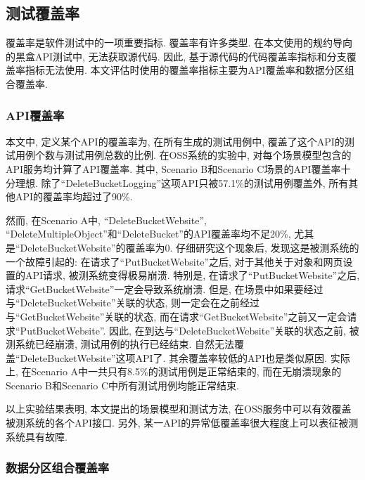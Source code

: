         \subsection{测试覆盖率}
            覆盖率是软件测试中的一项重要指标. 覆盖率有许多类型. 在本文使用的规约导向的黑盒API测试中, 无法获取源代码. 因此, 基于源代码的代码覆盖率指标和分支覆盖率指标无法使用. 本文评估时使用的覆盖率指标主要为API覆盖率和数据分区组合覆盖率.
            
            \subsubsection{API覆盖率}
            
                本文中, 定义某个API的覆盖率为, 在所有生成的测试用例中, 覆盖了这个API的测试用例个数与测试用例总数的比例. 在OSS系统的实验中, 对每个场景模型包含的API服务均计算了API覆盖率. 其中, Scenario B和Scenario C场景的API覆盖率十分理想. 除了“DeleteBucketLogging”这项API只被57.1\%的测试用例覆盖外, 所有其他API的覆盖率均超过了90\%.
                
                然而, 在Scenario A中, “DeleteBucketWebsite”, “DeleteMultipleObject”和“DeleteBucket”的API覆盖率均不足20\%, 尤其是“DeleteBucketWebsite”的覆盖率为0. 仔细研究这个现象后, 发现这是被测系统的一个故障引起的: 在请求了“PutBucketWebsite”之后, 对于其他关于对象和网页设置的API请求, 被测系统变得极易崩溃. 特别是, 在请求了“PutBucketWebsite”之后, 请求“GetBucketWebsite”一定会导致系统崩溃. 但是, 在场景中如果要经过与“DeleteBucketWebsite”关联的状态, 则一定会在之前经过与“GetBucketWebsite”关联的状态, 而在请求“GetBucketWebsite”之前又一定会请求“PutBucketWebsite”. 因此, 在到达与“DeleteBucketWebsite”关联的状态之前, 被测系统已经崩溃, 测试用例的执行已经结束. 自然无法覆盖“DeleteBucketWebsite”这项API了. 其余覆盖率较低的API也是类似原因. 实际上, 在Scenario A中一共只有8.5\%的测试用例是正常结束的, 而在无崩溃现象的Scenario B和Scenario C中所有测试用例均能正常结束.
                
                以上实验结果表明, 本文提出的场景模型和测试方法, 在OSS服务中可以有效覆盖被测系统的各个API接口. 另外, 某一API的异常低覆盖率很大程度上可以表征被测系统具有故障.
            
            \subsubsection{数据分区组合覆盖率}
            
                \label{sec:partition}
                
